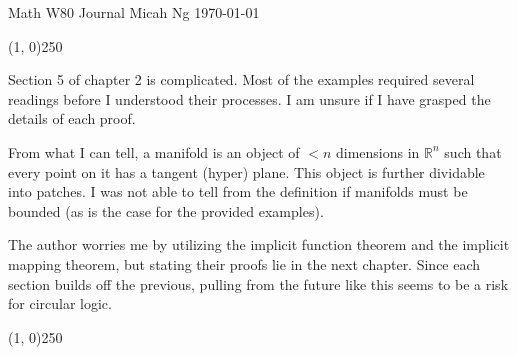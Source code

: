 \documentclass[11pt,letterpaper]{article}
\begin{document}
\noindent
Math W80 Journal \hfill Micah Ng \hfill \today

\begin{center}
\line(1, 0){250}
\end{center}

Section 5 of chapter 2 is complicated. Most of the examples required several
readings before I understood their processes. I am unsure if I have grasped the
details of each proof.

From what I can tell, a manifold is an object of $<n$ dimensions in
$\mathbb{R}^n$ such that every point on it has a tangent (hyper) plane. This
object is further dividable into patches. I was not able to tell from the
definition if manifolds must be bounded (as is the case for the provided
examples).

The author worries me by utilizing the implicit function theorem and the
implicit mapping theorem, but stating their proofs lie in the next chapter.
Since each section builds off the previous, pulling from the future like this
seems to be a risk for circular logic.

\begin{center}
\line(1, 0){250}
\end{center}
\end{document}
